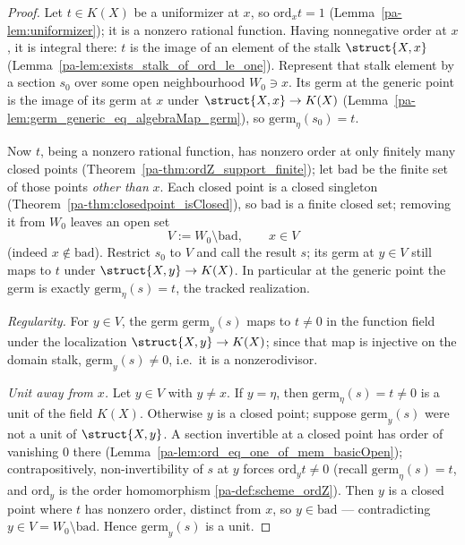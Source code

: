 \begin{proof}
  \leanok
  Let \(t \in K(X)\) be a uniformizer at \(x\), so \(\mathrm{ord}_x t = 1\)
  (Lemma~\ref{pa-lem:uniformizer}); it is a nonzero rational function. Having nonnegative order at
  \(x\), it is integral there: \(t\) is the image of an element of the stalk \(\struct{X,x}\)
  (Lemma~\ref{pa-lem:exists_stalk_of_ord_le_one}). Represent that stalk element by a section \(s_0\)
  over some open neighbourhood \(W_0 \ni x\). Its germ at the generic point is the image of its
  germ at \(x\) under \(\struct{X,x} \to K(X)\) (Lemma~\ref{pa-lem:germ_generic_eq_algebraMap_germ}),
  so \(\mathrm{germ}_\eta(s_0) = t\).

  Now \(t\), being a nonzero rational function, has nonzero order at only finitely many closed
  points (Theorem~\ref{pa-thm:ordZ_support_finite}); let \(\mathrm{bad}\) be the finite set of those
  points \emph{other than} \(x\). Each closed point is a closed singleton
  (Theorem~\ref{pa-thm:closedpoint_isClosed}), so \(\mathrm{bad}\) is a finite closed set; removing it
  from \(W_0\) leaves an open set
  \[
    V := W_0 \setminus \mathrm{bad}, \qquad x \in V
  \]
  (indeed \(x \notin \mathrm{bad}\)). Restrict \(s_0\) to \(V\) and call the result \(s\); its germ
  at \(y \in V\) still maps to \(t\) under \(\struct{X,y} \to K(X)\). In particular at the generic
  point the germ is exactly \(\mathrm{germ}_\eta(s) = t\), the tracked realization.

  \emph{Regularity.} For \(y \in V\), the germ \(\mathrm{germ}_y(s)\) maps to \(t \neq 0\) in the
  function field under the localization \(\struct{X,y} \to K(X)\); since that map is injective on
  the domain stalk, \(\mathrm{germ}_y(s) \neq 0\), i.e.\ it is a nonzerodivisor.

  \emph{Unit away from \(x\).} Let \(y \in V\) with \(y \neq x\). If \(y = \eta\), then
  \(\mathrm{germ}_\eta(s) = t \neq 0\) is a unit of the field \(K(X)\). Otherwise \(y\) is a closed
  point; suppose \(\mathrm{germ}_y(s)\) were not a unit of \(\struct{X,y}\). A section invertible at
  a closed point has order of vanishing \(0\) there (Lemma~\ref{pa-lem:ord_eq_one_of_mem_basicOpen});
  contrapositively, non-invertibility of \(s\) at \(y\) forces \(\mathrm{ord}_y t \neq 0\)
  (recall \(\mathrm{germ}_\eta(s) = t\), and \(\mathrm{ord}_y\) is the order homomorphism
  \ref{pa-def:scheme_ordZ}). Then \(y\) is a closed point where \(t\) has nonzero order, distinct from
  \(x\), so \(y \in \mathrm{bad}\) --- contradicting \(y \in V = W_0 \setminus \mathrm{bad}\). Hence
  \(\mathrm{germ}_y(s)\) is a unit.
\end{proof}

